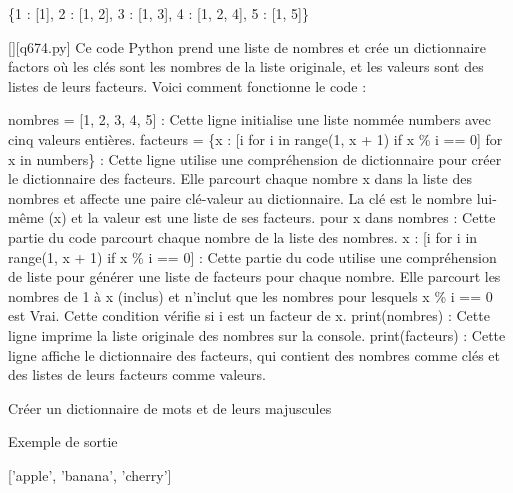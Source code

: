 \{1 : [1], 2 : [1, 2], 3 : [1, 3], 4 : [1, 2, 4], 5 : [1, 5]\}
        \par
        \begin{solution}
            \renewcommand{\nomfichier}{q674.py}
            \pythonfile{\chemincode \nomfichier}[][\nomfichier]
            Ce code Python prend une liste de nombres et crée un dictionnaire factors où les clés sont les nombres de la liste originale, et les valeurs sont des listes de leurs facteurs. Voici comment fonctionne le code :

    nombres = [1, 2, 3, 4, 5] : Cette ligne initialise une liste nommée numbers avec cinq valeurs entières.
    facteurs = \{x : [i for i in range(1, x + 1) if x \% i == 0] for x in numbers\} : Cette ligne utilise une compréhension de dictionnaire pour créer le dictionnaire des facteurs. Elle parcourt chaque nombre x dans la liste des nombres et affecte une paire clé-valeur au dictionnaire. La clé est le nombre lui-même (x) et la valeur est une liste de ses facteurs.
        pour x dans nombres : Cette partie du code parcourt chaque nombre de la liste des nombres.
        x : [i for i in range(1, x + 1) if x \% i == 0] : Cette partie du code utilise une compréhension de liste pour générer une liste de facteurs pour chaque nombre. Elle parcourt les nombres de 1 à x (inclus) et n'inclut que les nombres pour lesquels x \% i == 0 est Vrai. Cette condition vérifie si i est un facteur de x.
    print(nombres) : Cette ligne imprime la liste originale des nombres sur la console.
    print(facteurs) : Cette ligne affiche le dictionnaire des facteurs, qui contient des nombres comme clés et des listes de leurs facteurs comme valeurs.
        \end{solution}
        

        \question
        Créer un dictionnaire de mots et de leurs majuscules

Exemple de sortie

['apple', 'banana', 'cherry']

